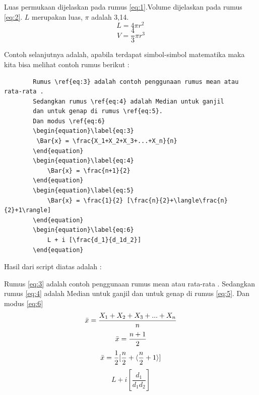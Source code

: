 Luas permukaan dijelaskan pada rumus \ref{eq:1}.Volume dijelaskan 
pada rumus \ref{eq:2}.
$L$ merupakan luas, $\pi$ adalah 3,14.
\begin{equation}\label{eq:1}
     L = 4 \pi r^2 \,
\end{equation}
 \begin{equation}\label{eq:2}
     V = \frac{4}{3}\pi r^3
\end{equation}
 
Contoh selanjutnya adalah, apabila terdapat simbol-simbol matematika maka kita bisa melihat contoh rumus berikut :

    \begin{verbatim}
		Rumus \ref{eq:3} adalah contoh penggunaan rumus mean atau rata-rata .
		Sedangkan rumus \ref{eq:4} adalah Median untuk ganjil  
		dan untuk genap di rumus \ref{eq:5}.
		Dan modus \ref{eq:6}
		\begin{equation}\label{eq:3}
		 \Bar{x} = \frac{X_1+X_2+X_3+...+X_n}{n}    
		\end{equation}
		\begin{equation}\label{eq:4}
		    \Bar{x} = \frac{n+1}{2}
		\end{equation}
		\begin{equation}\label{eq:5}
		    \Bar{x} = \frac{1}{2} [\frac{n}{2}+\langle\frac{n}{2}+1\rangle]
		\end{equation}
		\begin{equation}\label{eq:6}
		    L + i [\frac{d_1}{d_1d_2}]
		\end{equation}
    \end{verbatim}

Hasil dari script diatas adalah :

Rumus \ref{eq:3} adalah contoh penggunaan rumus mean atau rata-rata .
Sedangkan rumus \ref{eq:4} adalah Median untuk ganjil  
dan untuk genap di rumus \ref{eq:5}.
Dan modus \ref{eq:6}
\begin{equation}\label{eq:3}
 \Bar{x} = \frac{X_1+X_2+X_3+...+X_n}{n}    
\end{equation}
\begin{equation}\label{eq:4}
    \Bar{x} = \frac{n+1}{2}
\end{equation}
\begin{equation}\label{eq:5}
    \Bar{x} = \frac{1}{2} [\frac{n}{2}+\langle\frac{n}{2}+1\rangle]
\end{equation}
\begin{equation}\label{eq:6}
    L + i [\frac{d_1}{d_1d_2}]
\end{equation}

